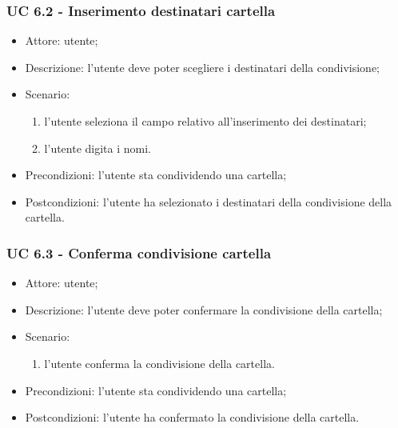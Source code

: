     \subsubsection{UC 6.2 - Inserimento destinatari cartella} \label{sec: UC 6.2}
    \begin{itemize}
        \item Attore: utente;
        \item Descrizione: l'utente deve poter scegliere i destinatari della condivisione;
        \item Scenario:
        \begin{enumerate}
        \item l'utente seleziona il campo relativo all'inserimento dei destinatari;
        \item l'utente digita i nomi.
        \end{enumerate}
        \item Precondizioni: l'utente sta condividendo una cartella;
        \item Postcondizioni: l'utente ha selezionato i destinatari della condivisione della cartella.
    \end{itemize}
    
    \subsubsection{UC 6.3 - Conferma condivisione cartella} \label{sec: UC 6.3}
    \begin{itemize}
        \item Attore: utente;
        \item Descrizione: l'utente deve poter confermare la condivisione della cartella;
        \item Scenario:
        \begin{enumerate}
        \item l'utente conferma la condivisione della cartella.
        \end{enumerate}
        \item Precondizioni: l'utente sta condividendo una cartella;
        \item Postcondizioni: l'utente ha confermato la condivisione della cartella.
    \end{itemize}

